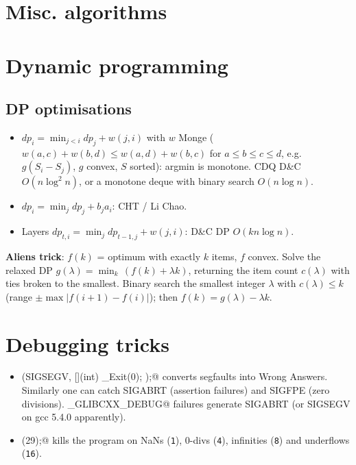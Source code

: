 \section{Misc. algorithms}

\section{Dynamic programming}
	\subsection{DP optimisations}
	\begin{itemize}[noitemsep]
	\item $dp_i=\min_{j<i}dp_j+w(j,i)$ with $w$ Monge ($w(a,c)+w(b,d)\le w(a,d)+w(b,c)$ for $a\le b\le c\le d$, e.g.\ $g(S_i-S_j)$, $g$ convex, $S$ sorted): argmin is monotone. CDQ D\&C $O(n\log^2n)$, or a monotone deque with binary search $O(n\log n)$.
	\item $dp_i=\min_jdp_j+b_ja_i$: CHT / Li Chao.
	\item Layers $dp_{t,i}=\min_jdp_{t-1,j}+w(j,i)$: D\&C DP $O(kn\log n)$.
	\end{itemize}
	\textbf{Aliens trick}: $f(k)$ = optimum with exactly $k$ items, $f$ convex. Solve the relaxed DP $g(\lambda)=\min_k\,(f(k)+\lambda k)$, returning the item count $c(\lambda)$ with ties broken to the smallest. Binary search the smallest integer $\lambda$ with $c(\lambda)\le k$ (range $\pm\max|f(i+1)-f(i)|$); then $f(k)=g(\lambda)-\lambda k$.


\section{Debugging tricks}
	\begin{itemize}
		\item \verb@signal(SIGSEGV, [](int) { _Exit(0); });@ converts segfaults into Wrong Answers.
			Similarly one can catch SIGABRT (assertion failures) and SIGFPE (zero divisions).
			\verb@_GLIBCXX_DEBUG@ failures generate SIGABRT (or SIGSEGV on gcc 5.4.0 apparently).
		\item \verb@feenableexcept(29);@ kills the program on NaNs (\texttt 1), 0-divs (\texttt 4), infinities (\texttt 8) and underflows (\texttt{16}).
	\end{itemize}

